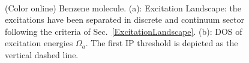 \documentclass[reprint,aps,prb]{revtex4-1}
\begin{document}
\begin{figure}[ht]
\centering
{} \\
\centering
{} %
\caption{(Color online) Benzene molecule. (a): Excitation Landscape: the excitations have been separated in discrete and continuum sector following the criteria of Sec.~\ref{ExcitationLandscape}. (b): DOS of excitation energies $\Omega_a$. The first IP threshold is depicted as the vertical dashed line.}
\end{figure}
\end{document}
